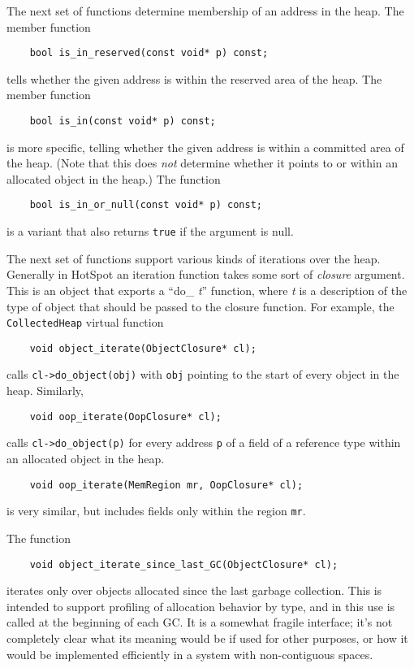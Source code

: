 \documentclass{article}
\begin{document}
The next set of functions determine membership of an address in the
heap.  The member function
\begin{verbatim}
    bool is_in_reserved(const void* p) const;
\end{verbatim}
tells whether the given address is within the reserved area of the
heap.  The member function
\begin{verbatim}
    bool is_in(const void* p) const;
\end{verbatim}
is more specific, telling whether the given address is within a
committed area of the heap.  (Note that this does {\em not} determine
whether it points to or within an allocated object in the heap.)  The function
\begin{verbatim}
    bool is_in_or_null(const void* p) const;
\end{verbatim}
is a variant that also returns {\tt true} if the argument is
null.

The next set of functions support various kinds of iterations over the
heap.  Generally in HotSpot an iteration function takes some sort of
{\em closure} argument.  This is an object that exports a ``do\_{\em
t}'' function, where {\em t} is a description of the type of object
that should be passed to the closure function.  For example, the
{\tt CollectedHeap} virtual function
\begin{verbatim}
    void object_iterate(ObjectClosure* cl);
\end{verbatim}
calls {\tt cl->do\_object(obj)} with {\tt obj} pointing to the start of
every object in the heap.  Similarly,
\begin{verbatim}
    void oop_iterate(OopClosure* cl);
\end{verbatim}
calls {\tt cl->do\_object(p)} for every address {\tt p} of a field of a
reference type within an allocated object in the heap.
\begin{verbatim}
    void oop_iterate(MemRegion mr, OopClosure* cl);
\end{verbatim}
is very similar, but includes fields only within the region {\tt mr}.

The function
\begin{verbatim}
    void object_iterate_since_last_GC(ObjectClosure* cl);
\end{verbatim}
iterates only over objects allocated since the last garbage
collection.  This is intended to support profiling of allocation
behavior by type, and in this use is called at the beginning of each GC.
It is a somewhat fragile interface; it's not completely clear what its
meaning would be if used for other purposes, or how it would be
implemented efficiently in a system with non-contiguous spaces.
\end{document}
